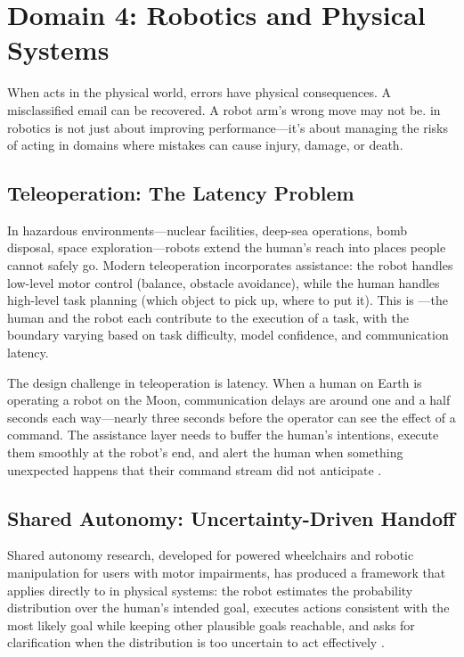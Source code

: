 \section{Domain 4: Robotics and Physical Systems}
\label{sec:robotics}

When \ai acts in the physical world, errors have physical consequences. A misclassified email can be recovered. A robot arm's wrong move may not be. \hitl in robotics is not just about improving \ai performance---it's about managing the risks of \ai acting in domains where mistakes can cause injury, damage, or death.

\subsection{Teleoperation: The Latency Problem}

In hazardous environments---nuclear facilities, deep-sea operations, bomb disposal, space exploration---robots extend the human's reach into places people cannot safely go. Modern teleoperation incorporates \ai assistance: the robot handles low-level motor control (balance, obstacle avoidance), while the human handles high-level task planning (which object to pick up, where to put it). This is ---the human and the robot each contribute to the execution of a task, with the boundary varying based on task difficulty, model confidence, and communication latency.

The \hitl design challenge in teleoperation is latency. When a human on Earth is operating a robot on the Moon, communication delays are around one and a half seconds each way---nearly three seconds before the operator can see the effect of a command. The \ai assistance layer needs to buffer the human's intentions, execute them smoothly at the robot's end, and alert the human when something unexpected happens that their command stream did not anticipate \autocite{hauser2013teleoperation}.

\subsection{Shared Autonomy: Uncertainty-Driven Handoff}

Shared autonomy research, developed for powered wheelchairs and robotic manipulation for users with motor impairments, has produced a framework that applies directly to \hitl in physical systems: the robot estimates the probability distribution over the human's intended goal, executes actions consistent with the most likely goal while keeping other plausible goals reachable, and asks for clarification when the distribution is too uncertain to act effectively \autocite{javdani2015shared}.

